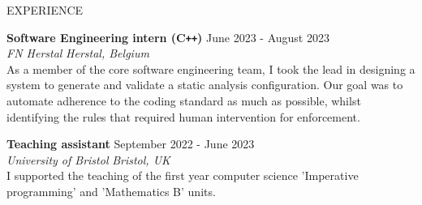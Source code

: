 \documentclass{resume} %
\begin{document}
\begin{rSection}{EXPERIENCE}

  \textbf{Software Engineering intern (C\texttt{++})} \hfill June 2023 - August 2023\\
\textit{FN Herstal} \hfill \textit{Herstal, Belgium} \\
As a member of the core software engineering team, I took the lead in designing a system to generate and validate a static analysis configuration. Our goal was to automate adherence to the coding standard as much as possible, whilst identifying the rules that required human intervention for enforcement.

\textbf{Teaching assistant} \hfill September 2022 - June 2023\\
\textit{University of Bristol} \hfill \textit{Bristol, UK} \\
I supported the teaching of the first year computer science 'Imperative programming' and 'Mathematics B' units.
 
\end{rSection} 

\end{document}
